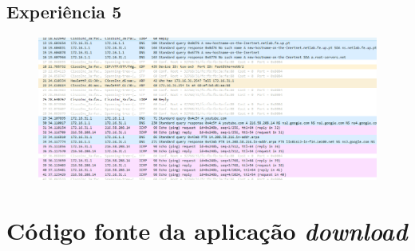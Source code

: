 \documentclass{article}
\begin{document}
\subsection{Experiência 5}
\begin{figure}[H]
\centering
\includegraphics[width=1.0\textwidth]{exp5-1.PNG}
\end{figure}

\section{Código fonte da aplicação \textit{download}}
\end{document}
